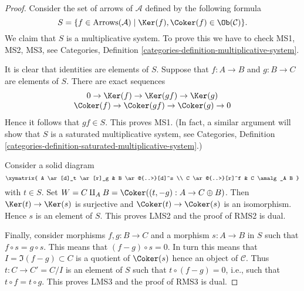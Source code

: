 \begin{proof}
Consider the set of arrows of $\mathcal{A}$ defined by
the following formula
$$
S = \{f \in \text{Arrows}(\mathcal{A}) \mid
\Ker(f), \Coker(f) \in \Ob(\mathcal{C}) \}.
$$
We claim that $S$ is a multiplicative system. To prove this we have
to check MS1, MS2, MS3, see
Categories, Definition \ref{categories-definition-multiplicative-system}.

\medskip\noindent
It is clear that identities are elements of $S$. Suppose that
$f : A \to B$ and $g : B \to C$ are elements of $S$.
There are exact sequences
$$
\begin{matrix}
0 \to \Ker(f) \to \Ker(gf) \to \Ker(g) \\
\Coker(f) \to \Coker(gf) \to \Coker(g) \to 0
\end{matrix}
$$
Hence it follows that $gf \in S$. This proves MS1. (In fact, a similar
argument will show that $S$ is a saturated multiplicative system, see
Categories, Definition
\ref{categories-definition-saturated-multiplicative-system}.)

\medskip\noindent
Consider a solid diagram
$$
\xymatrix{
A \ar[d]_t \ar[r]_g & B \ar@{..>}[d]^s \\
C \ar@{..>}[r]^f & C \amalg_A B
}
$$
with $t \in S$. Set
$W = C \amalg_A B =  \Coker((t, -g) : A \to C \oplus B)$.
Then $\Ker(t) \to \Ker(s)$ is surjective and
$\Coker(t) \to \Coker(s)$ is an isomorphism. Hence
$s$ is an element of $S$. This proves LMS2 and the proof of RMS2 is dual.

\medskip\noindent
Finally, consider morphisms $f, g : B \to C$ and a morphism $s : A \to B$
in $S$ such that $f \circ s = g \circ s$. This means that
$(f - g) \circ s = 0$. In turn this means that
$I = \Im(f - g) \subset C$ is a quotient of $\Coker(s)$
hence an object of $\mathcal{C}$. Thus $t : C \to C' = C/I$ is an
element of $S$ such that $t \circ (f - g) = 0$, i.e., such that
$t \circ f = t \circ g$. This proves LMS3 and the proof of
RMS3 is dual.


\end{proof}
